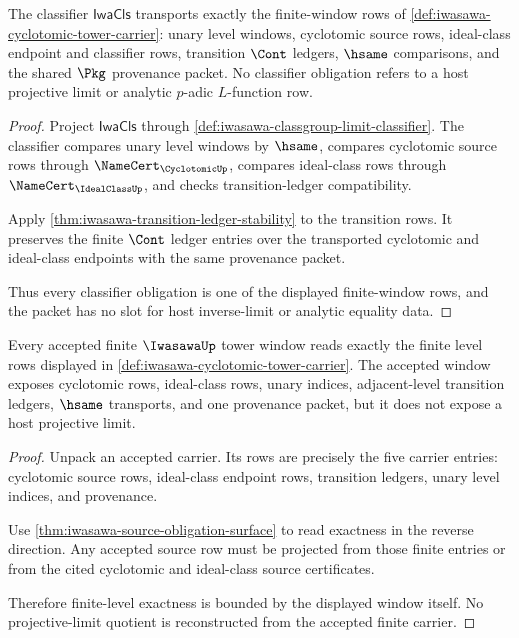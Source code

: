 \begin{theorem}
\label{thm:iwasawa-window-classifier-obligations}
The classifier $\mathsf{IwaCls}$ transports exactly the finite-window rows of
\autoref{def:iwasawa-cyclotomic-tower-carrier}: unary level windows,
cyclotomic source rows, ideal-class endpoint and classifier rows, transition
$\Cont$ ledgers, $\hsame$ comparisons, and the shared $\Pkg$ provenance packet.
No classifier obligation refers to a host projective limit or analytic
$p$-adic $L$-function row.
\end{theorem}
\begin{proof}
Project $\mathsf{IwaCls}$ through
\autoref{def:iwasawa-classgroup-limit-classifier}. The classifier compares
unary level windows by $\hsame$, compares cyclotomic source rows through
$\NameCert_{\CyclotomicUp}$, compares ideal-class rows through
$\NameCert_{\IdealClassUp}$, and checks transition-ledger compatibility.

Apply \autoref{thm:iwasawa-transition-ledger-stability} to the transition
rows. It preserves the finite $\Cont$ ledger entries over the transported
cyclotomic and ideal-class endpoints with the same provenance packet.

Thus every classifier obligation is one of the displayed finite-window rows,
and the packet has no slot for host inverse-limit or analytic equality data.
\end{proof}

\begin{theorem}
\label{thm:iwasawa-finite-level-exactness}
Every accepted finite $\IwasawaUp$ tower window reads exactly the finite level
rows displayed in \autoref{def:iwasawa-cyclotomic-tower-carrier}. The accepted
window exposes cyclotomic rows, ideal-class rows, unary indices, adjacent-level
transition ledgers, $\hsame$ transports, and one provenance packet, but it does
not expose a host projective limit.
\end{theorem}
\begin{proof}
Unpack an accepted carrier. Its rows are precisely the five carrier entries:
cyclotomic source rows, ideal-class endpoint rows, transition ledgers, unary
level indices, and provenance.

Use \autoref{thm:iwasawa-source-obligation-surface} to read exactness in the
reverse direction. Any accepted source row must be projected from those finite
entries or from the cited cyclotomic and ideal-class source certificates.

Therefore finite-level exactness is bounded by the displayed window itself.
No projective-limit quotient is reconstructed from the accepted finite
carrier.
\end{proof}

